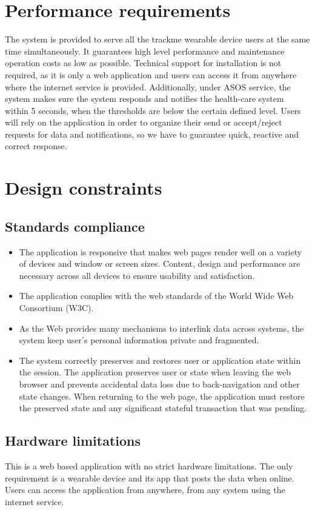 \documentclass[a4paper, hidelinks, 12pt]{report}
\begin{document}
	\section{Performance requirements}
	The system is provided to serve all the trackme wearable device users at the same time simultaneously. It guarantees high level performance and maintenance operation costs as low as possible. Technical support for installation is not required, as it is only a web application and users can access it from anywhere where the internet service is provided. Additionally, under ASOS service, the system makes sure the system responds and notifies the health-care system within 5 seconds, when the thresholds are below the certain defined level. Users will rely on the application in order to organize their send or accept/reject requests for data and notifications, so we have to guarantee quick, reactive and correct response.
	
	\section{Design constraints}
	\subsection{Standards compliance}
	\begin{itemize}
		\item{} The application is responsive that makes web pages render well on a variety of devices and window or screen sizes. Content, design and performance are necessary across all devices to ensure usability and satisfaction.
		\item{} The application complies with the web standards of the World Wide Web Consortium (W3C).
		\item{} As the Web provides many mechanisms to interlink data across systems, the system keep user's personal information private and fragmented.
		\item{} The system correctly preserves and restores user or application state within the session. The application preserves user or state when leaving the web browser and prevents accidental data loss due to back-navigation and other state changes. When returning to the web page, the application must restore the preserved state and any significant stateful transaction that was pending.
	\end{itemize}
	
	\subsection{Hardware limitations}
	This is a web based application with no strict hardware limitations. The only requirement is a wearable device and its app that posts the data when online. Users can access the application from anywhere, from any system using the internet service.
	
\end{document}
